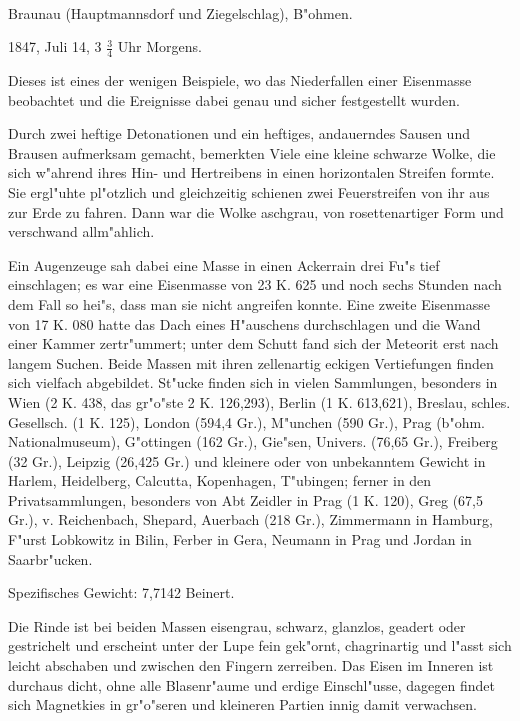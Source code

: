 \documentclass[a4paper, 11pt, oneside]{article}
\begin{document}
\paragraph{}
Braunau (Hauptmannsdorf und Ziegelschlag), B"ohmen.

1847, Juli 14, 3 $\frac{3}{4}$ Uhr Morgens.

Dieses ist eines der wenigen Beispiele, wo das Niederfallen einer Eisenmasse beobachtet und die Ereignisse dabei genau und sicher festgestellt wurden.

Durch zwei heftige Detonationen und ein heftiges, andauerndes Sausen und Brausen aufmerksam gemacht, bemerkten Viele eine kleine schwarze Wolke, die sich w"ahrend ihres Hin- und Hertreibens in einen horizontalen Streifen formte. Sie ergl"uhte pl"otzlich und gleichzeitig schienen zwei Feuerstreifen von ihr aus zur Erde zu fahren. Dann war die Wolke aschgrau, von rosettenartiger Form und verschwand allm"ahlich.

Ein Augenzeuge sah dabei eine Masse in einen Ackerrain drei Fu"s tief einschlagen; es war eine Eisenmasse von 23 K. 625 und noch sechs Stunden nach dem Fall so hei"s, dass man sie nicht angreifen konnte. Eine zweite Eisenmasse von 17 K. 080 hatte das Dach eines H"auschens durchschlagen und die Wand einer Kammer zertr"ummert; unter dem Schutt fand sich der Meteorit erst nach langem Suchen. Beide Massen mit ihren zellenartig eckigen Vertiefungen finden sich vielfach abgebildet. St"ucke finden sich in vielen Sammlungen, besonders in Wien (2 K. 438, das gr"o"ste 2 K. 126,293), Berlin (1 K. 613,621), Breslau, schles. Gesellsch. (1 K. 125), London (594,4 Gr.), M"unchen (590 Gr.), Prag (b"ohm. Nationalmuseum), G"ottingen (162 Gr.), Gie"sen, Univers. (76,65 Gr.), Freiberg (32 Gr.), Leipzig (26,425 Gr.) und kleinere oder von unbekanntem Gewicht in Harlem, Heidelberg, Calcutta, Kopenhagen, T"ubingen; ferner in den Privatsammlungen, besonders von Abt Zeidler in Prag (1 K. 120), Greg (67,5 Gr.), v. Reichenbach, Shepard, Auerbach (218 Gr.), Zimmermann in Hamburg, F"urst Lobkowitz in Bilin, Ferber in Gera, Neumann in Prag und Jordan in Saarbr"ucken.

Spezifisches Gewicht: 7,7142 Beinert.

Die Rinde ist bei beiden Massen eisengrau, schwarz, glanzlos, geadert oder gestrichelt und erscheint unter der Lupe fein gek"ornt, chagrinartig und l"asst sich leicht abschaben und zwischen den Fingern zerreiben. Das Eisen im Inneren ist durchaus dicht, ohne alle Blasenr"aume und erdige Einschl"usse, dagegen findet sich Magnetkies in gr"o"seren und kleineren Partien innig damit verwachsen.
\end{document}

